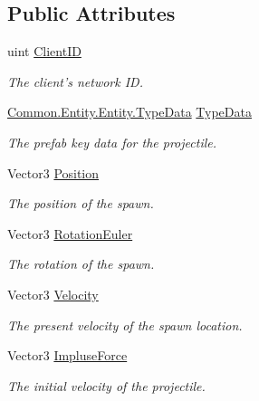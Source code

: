 \subsection*{Public Attributes}
\begin{DoxyCompactItemize}
\item 
uint \hyperlink{class_skyrates_1_1_client_1_1_network_1_1_event_1_1_event_request_spawn_entity_projectile_a4188bfb7096250e94f64d54a611015e4}{Client\-I\-D}
\begin{DoxyCompactList}\small\item\em The client's network I\-D. \end{DoxyCompactList}\item 
\hyperlink{class_skyrates_1_1_common_1_1_entity_1_1_entity_1_1_type_data}{Common.\-Entity.\-Entity.\-Type\-Data} \hyperlink{class_skyrates_1_1_client_1_1_network_1_1_event_1_1_event_request_spawn_entity_projectile_a433e4192bec33d53b535eb1eaf3a3b73}{Type\-Data}
\begin{DoxyCompactList}\small\item\em The prefab key data for the projectile. \end{DoxyCompactList}\item 
Vector3 \hyperlink{class_skyrates_1_1_client_1_1_network_1_1_event_1_1_event_request_spawn_entity_projectile_a0c9e57ff4b90b85b55b0f1dd2c72ac6a}{Position}
\begin{DoxyCompactList}\small\item\em The position of the spawn. \end{DoxyCompactList}\item 
Vector3 \hyperlink{class_skyrates_1_1_client_1_1_network_1_1_event_1_1_event_request_spawn_entity_projectile_adf91fb852294daf0456ce0c42ade8139}{Rotation\-Euler}
\begin{DoxyCompactList}\small\item\em The rotation of the spawn. \end{DoxyCompactList}\item 
Vector3 \hyperlink{class_skyrates_1_1_client_1_1_network_1_1_event_1_1_event_request_spawn_entity_projectile_a418b03ceaf88177214e4f49f9add2fd6}{Velocity}
\begin{DoxyCompactList}\small\item\em The present velocity of the spawn location. \end{DoxyCompactList}\item 
Vector3 \hyperlink{class_skyrates_1_1_client_1_1_network_1_1_event_1_1_event_request_spawn_entity_projectile_a23b895cda7a52e28d83d1f7045e0b06a}{Impluse\-Force}
\begin{DoxyCompactList}\small\item\em The initial velocity of the projectile. \end{DoxyCompactList}\end{DoxyCompactItemize}
